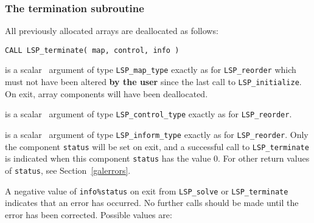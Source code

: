 \documentclass{galahad}
\newcommand{\packagename}{LSP}
\begin{document}

\subsubsection{The  termination subroutine}
All previously allocated arrays are deallocated as follows:
\vspace*{1mm}

\hspace{8mm}
{\tt CALL \packagename\_terminate( map, control, info )}

\vspace*{-3mm}
\begin{description}

 is a scalar \intentinout\ argument of type
{\tt \packagename\_map\_type}
exactly as for
{\tt \packagename\_reorder}
which must not have been altered {\bf by the user} since the last call to
{\tt \packagename\_initialize}.
On exit, array components will have been deallocated.

 is a scalar \intentin\ argument of type
{\tt \packagename\_control\_type}
exactly as for
{\tt \packagename\_reorder}.

 is a scalar \intentout\ argument of type
{\tt \packagename\_inform\_type}
exactly as for
{\tt \packagename\_reorder}.
Only the component {\tt status} will be set on exit, and a
successful call to
{\tt \packagename\_terminate}
is indicated when this  component {\tt status} has the value 0.
For other return values of {\tt status}, see Section~\ref{galerrors}.

\end{description}


\galerrors
A negative value of {\tt info\%status} on exit from
{\tt \packagename\_solve}
or
{\tt \packagename\_terminate}
indicates that an error has occurred. No further calls should be made
until the error has been corrected. Possible values are:
\end{document}
